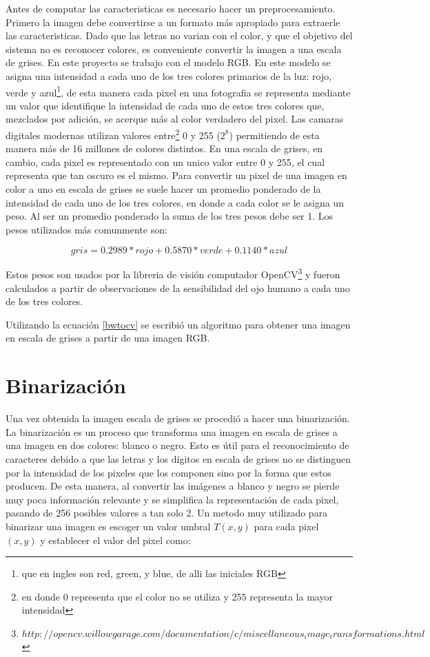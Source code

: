 \documentclass[a4paper, 11pt, oneside]{report}
\begin{document}
Antes de computar las caracteristicas es necesario hacer un preprocesamiento. Primero la imagen debe convertirse a un formato más apropiado para extraerle las caracteristicas. Dado que las letras no varian con el color, y que el objetivo del sistema no es reconocer colores, es conveniente convertir la imagen a una escala de grises. En este proyecto se trabajo con el modelo RGB. En este modelo se asigna una intensidad a cada uno de los tres colores primarios de la luz: rojo, verde y azul\footnote{que en ingles son red, green, y blue, de alli las iniciales RGB}, de esta manera cada pixel en una fotografia se representa mediante un valor que identifique la intensidad de cada uno de estos tres colores que, mezclados por adición, se acerque más al color verdadero del pixel. Las camaras digitales modernas utilizan valores entre\footnote{en donde 0 representa que el color no se utiliza y 255 representa la mayor intensidad} 0 y 255 ($2^8$) permitiendo de esta manera más de 16 millones de colores distintos. En una escala de grises, en cambio, cada pixel es representado con un unico valor entre 0 y 255, el cual representa que tan oscuro es el mismo. Para convertir un pixel de una imagen en color a uno en escala de grises se suele hacer un promedio ponderado de la intensidad de cada uno de los tres colores, en donde a cada color se le asigna un peso. Al ser un promedio ponderado la suma de los tres pesos debe ser 1. Los pesos utilizados más comunmente son:

\begin{equation}\label{bwtocv}
	gris = 0.2989 * rojo + 0.5870 * verde + 0.1140 * azul 
\end{equation}

Estos pesos son usados por la libreria de visión computador OpenCV\footnote{$http://opencv.willowgarage.com/documentation/c/miscellaneous_image_transformations.html$} y fueron calculados a partir de observaciones de la sensibilidad del ojo humano a cada uno de los tres colores. 

Utilizando la ecuación \eqref{bwtocv} se escribió un algoritmo para obtener una imagen en escala de grises a partir de una imagen RGB. 

\section{Binarización}

Una vez obtenida la imagen escala de grises se procedió a hacer una binarización. La binarización es un proceso que transforma una imagen en escala de grises a una imagen en dos colores: blanco o negro. Esto es útil para el reconocimiento de caracteres debido a que las letras y los dígitos en escala de grises no se distinguen por la intensidad de los pixeles que los componen sino por la forma que estos producen. De esta manera, al convertir las imágenes a blanco y negro se pierde muy poca información relevante y se simplifica la representación de cada pixel, pasando de 256 posibles valores a tan solo 2. Un metodo muy utilizado para binarizar una imagen es escoger un valor umbral $T(x,y)$ para cada pixel $(x,y)$ y establecer el valor del pixel como:
\end{document}
